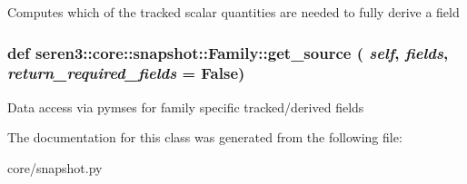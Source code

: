 \label{classseren3_1_1core_1_1snapshot_1_1Family_a33fdf6f8b0e71125dbbd80567a386d54}
\begin{DoxyVerb}
Computes which of the tracked scalar quantities are needed to fully derive a field
\end{DoxyVerb}
 \hypertarget{classseren3_1_1core_1_1snapshot_1_1Family_a25026f7170c2ddca3af6645d63671a78}{
\subsubsection[{get\_\-source}]{\setlength{\rightskip}{0pt plus 5cm}def seren3::core::snapshot::Family::get\_\-source ( {\em self}, \/   {\em fields}, \/   {\em return\_\-required\_\-fields} = {\ttfamily False})}}
\label{classseren3_1_1core_1_1snapshot_1_1Family_a25026f7170c2ddca3af6645d63671a78}
\begin{DoxyVerb}
Data access via pymses for family specific tracked/derived fields
\end{DoxyVerb}
 

The documentation for this class was generated from the following file:\begin{DoxyCompactItemize}
\item 
core/snapshot.py\end{DoxyCompactItemize}
